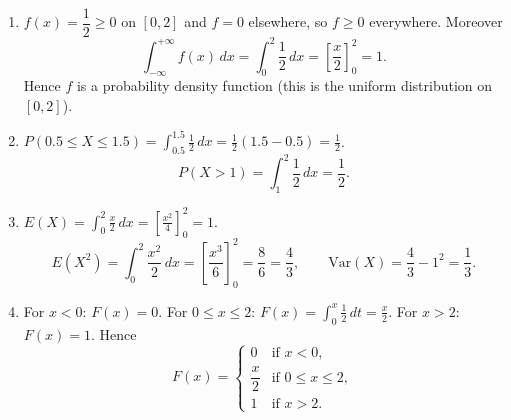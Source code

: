 \documentclass[11pt]{article}
\begin{document}
\begin{corrige}
\begin{enumerate}
\item $f(x)=\dfrac12\geq 0$ on $[0,2]$ and $f=0$ elsewhere, so $f\geq 0$ everywhere. Moreover
\[\int_{-\infty}^{+\infty} f(x)\,dx=\int_0^2 \frac12\,dx=\left[\frac{x}{2}\right]_0^2=1.\]
Hence $f$ is a probability density function (this is the uniform distribution on $[0,2]$).

\item $P(0.5\leq X\leq 1.5)=\displaystyle\int_{0.5}^{1.5}\frac12\,dx=\frac12(1.5-0.5)=\frac12$.
\[
P(X>1)=\int_1^2 \frac12\,dx=\frac12.
\]

\item $E(X)=\displaystyle\int_0^2 \frac{x}{2}\,dx=\left[\frac{x^2}{4}\right]_0^2=1$.
\[
E(X^2)=\int_0^2 \frac{x^2}{2}\,dx=\left[\frac{x^3}{6}\right]_0^2=\frac{8}{6}=\frac{4}{3},\qquad
\mathrm{Var}(X)=\frac{4}{3}-1^2=\frac{1}{3}.
\]

\item For $x<0$: $F(x)=0$. For $0\leq x\leq 2$: $F(x)=\displaystyle\int_0^x \frac12\,dt=\frac{x}{2}$. For $x>2$: $F(x)=1$. Hence
\[
F(x)=\begin{cases} 0 & \text{if } x<0,\\ \dfrac{x}{2} & \text{if } 0\leq x\leq 2,\\ 1 & \text{if } x>2.\end{cases}
\]
\end{enumerate}
\end{corrige}
\end{document}
